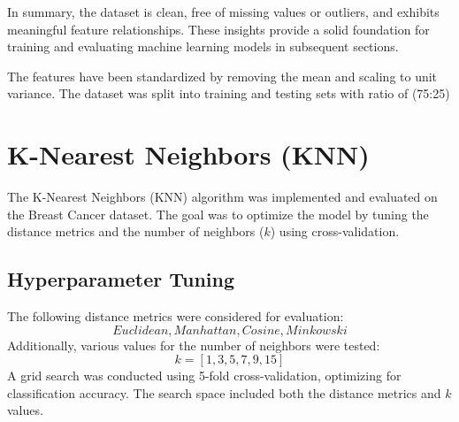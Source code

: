 \documentclass[12pt]{article}
\begin{document}
In summary, the dataset is clean, free of missing values or outliers, and exhibits meaningful feature relationships. These insights provide a solid foundation for training and evaluating machine learning models in subsequent sections. 

The features have been standardized by removing the mean and scaling to unit variance. The dataset was split into training and testing sets with ratio of (75:25)


\section{K-Nearest Neighbors (KNN)}


The K-Nearest Neighbors (KNN) algorithm was implemented and evaluated on the Breast Cancer dataset. The goal was to optimize the model by tuning the distance metrics and the number of neighbors ($k$) using cross-validation.\cite{guo2003knn}

\subsection*{Hyperparameter Tuning}
The following distance metrics were considered for evaluation:
\[
Euclidean, Manhattan, Cosine, Minkowski
\]
Additionally, various values for the number of neighbors were tested:
\[
k = [1, 3, 5, 7, 9, 15]
\]
A grid search was conducted using 5-fold cross-validation, optimizing for classification accuracy. The search space included both the distance metrics and $k$ values. 

\vspace{-10pt} %
\end{document}
